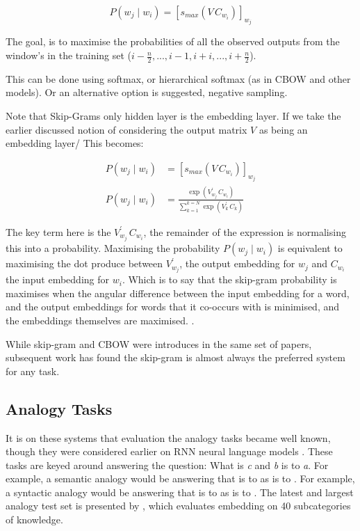 \documentclass[parskip]{komatufte}
\begin{document}
\begin{equation}
P(w_j \mid w_{i}) = \left[ s_{max}(V\,C_{w_{i}}) \right]_{w_j} 
\end{equation}


The goal, is to maximise the probabilities of all the observed outputs from the window's in the training set ($i-\frac{n}{2},...,i-1, i+i,...,i+\frac{n}{2}$).


This can be done using softmax, or hierarchical softmax (as in CBOW and other models).
Or an alternative option is suggested, negative sampling.

Note that Skip-Grams only hidden layer is the embedding layer.
If we take the earlier discussed notion of considering the output matrix $V$ as being an embedding layer/
This becomes:

\begin{align}
P(w_j \mid w_{i}) & = \left[ s_{max}(V\,C_{w_{i}}) \right]_{w_j} \\
P(w_j \mid w_{i}) & = \frac{\exp(V_{w_j}^\prime\,C_{w_{i}})}{\sum_{k=1}^{k=N} \exp(V_k^\prime\,C_{k})}
\end{align}

The key term here is the $V_{w_j}^\prime\,C_{w_{i}}$,
the remainder of the expression is normalising this into a probability.
Maximising the probability $P(w_j \mid w_{i})$ is equivalent to maximising the dot produce between $V_{w_j}^\prime$, the output embedding for $w_j$ and  $C_{w_i}$ the input embedding for $w_i$.
Which is to say that the skip-gram probability is maximises when the angular difference between the input embedding for a word, and the output embeddings for words that it co-occurs with is minimised, and the embeddings themselves are maximised.
.


While skip-gram and CBOW were introduces in the same set of papers, subsequent work has found the skip-gram is almost always the preferred system for any task. 

\subsection{Analogy Tasks}

It is on these systems that evaluation the analogy tasks became well known, though they were considered earlier on RNN neural language models .
These tasks are keyed around answering the question: What is  \emph{c} and \emph{b} is to \emph{a}.
For example, a semantic analogy would be answering that  is to  as  is to .
For example, a syntactic analogy would be answering that  is to  as  is to .
The latest and largest analogy test set is presented by ,
which evaluates embedding on 40 subcategories of knowledge.
\end{document}

